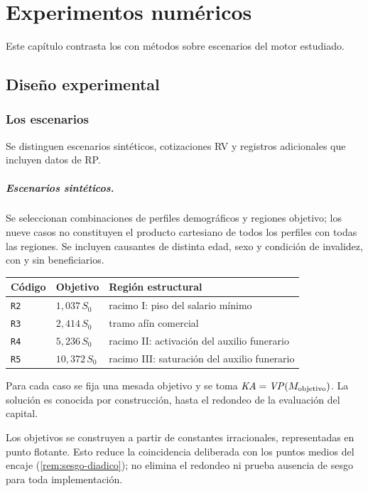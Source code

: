 \chapter{Experimentos numéricos}
\label{cap:resultados}

Este capítulo contrasta los  con
\datoNMetodos{} métodos sobre \datoNEscenarios{} escenarios del motor estudiado.

\section{Diseño experimental}
\subsection{Los escenarios}
Se distinguen \datoNSinteticos{} escenarios sintéticos, \datoNReales{}
cotizaciones RV y \datoNRealesRP{} registros adicionales que incluyen datos de RP.

\paragraph{Escenarios sintéticos.}
Se seleccionan combinaciones de perfiles demográficos y regiones objetivo;
los nueve casos no constituyen el producto cartesiano de todos los perfiles
con todas las regiones. Se incluyen causantes de distinta edad, sexo y
condición de invalidez, con y sin beneficiarios.
\begin{center}
\small
\begin{tabular}{@{}llp{7.2cm}@{}}
\toprule
\textbf{Código} & \textbf{Objetivo} & \textbf{Región estructural} \\
\midrule
\texttt{R2} & $1{,}037\,S_0$ & racimo I: piso del salario mínimo \\
\texttt{R3} & $2{,}414\,S_0$ & tramo afín comercial \\
\texttt{R4} & $5{,}236\,S_0$ & racimo II: activación del auxilio funerario \\
\texttt{R5} & $10{,}372\,S_0$ & racimo III: saturación del auxilio funerario \\
\bottomrule
\end{tabular}
\end{center}
Para cada caso se fija una mesada objetivo y se toma
$\mathit{KA}=\mathit{VP}(M_{\mathrm{objetivo}})$. La solución es conocida por construcción,
hasta el redondeo de la evaluación del capital.
\begin{remark}
Los objetivos se construyen a partir de constantes irracionales, representadas
en punto flotante. Esto reduce la coincidencia deliberada con los puntos
medios del encaje (\cref{rem:sesgo-diadico}); no elimina el redondeo ni
prueba ausencia de sesgo para toda implementación.
\end{remark}

